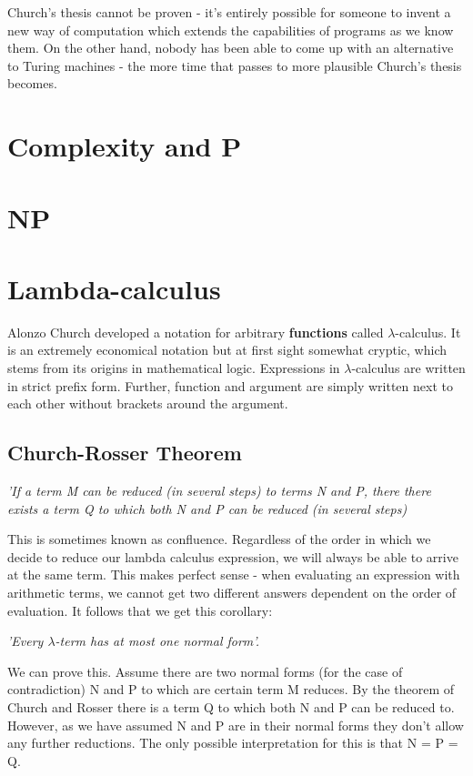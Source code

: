 \documentclass[11pt]{article}
\begin{document}
	\par Church's thesis cannot be proven - it's entirely possible for someone to invent a new way of computation which extends the capabilities of programs as we know them. On the other hand, nobody has been able to come up with an alternative to Turing machines - the more time that passes to more plausible Church's thesis becomes.
	
	\section{Complexity and P}
	
	\section{NP}
	
	\section{Lambda-calculus}
	Alonzo Church developed a notation for arbitrary \textbf{functions} called $\lambda$-calculus. It is an extremely economical notation but at first sight somewhat cryptic, which stems from its origins in mathematical logic. Expressions in $\lambda$-calculus are written in strict prefix form. Further, function and argument are simply written next to each other without brackets around the argument.
	
	
	\subsection{Church-Rosser Theorem}
	\textit{'If a term M can be reduced (in several steps) to terms N and P, there there exists a term Q to which both N and P can be reduced (in several steps)}
	\linebreak
	\par This is sometimes known as confluence. Regardless of the order in which we decide to reduce our lambda calculus expression, we will always be able to arrive at the same term. This makes perfect sense - when evaluating an expression with arithmetic terms, we cannot get two different answers dependent on the order of evaluation. It follows that we get this corollary:
	\linebreak	
	
	\textit{'Every $\lambda$-term has at most one normal form'.}
	
	\par
	We can prove this. Assume there are two normal forms (for the case of contradiction) N and P to which are certain term M reduces. By the theorem of Church and Rosser there is a term Q to which both N and P can be reduced to. However, as we have assumed N and P are in their normal forms they don't allow any further reductions. The only possible interpretation for this is that N = P = Q.
	
\end{document}
